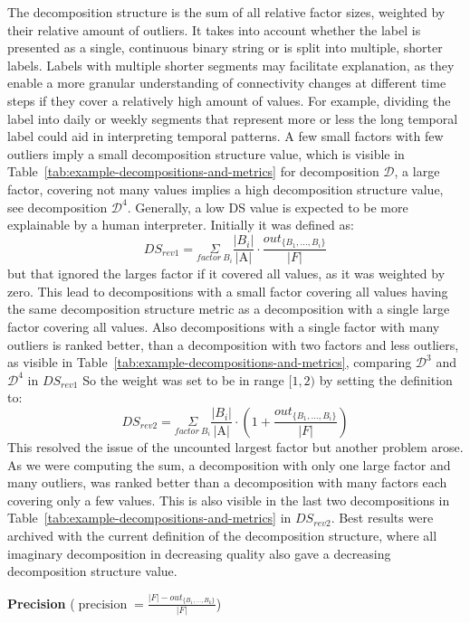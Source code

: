 The decomposition structure is the sum of all relative factor sizes, weighted by their relative amount of outliers.
It takes into account whether the label is presented as a single, continuous binary string or is split into multiple, shorter labels.
Labels with multiple shorter segments may facilitate explanation, as they enable a more granular understanding of connectivity changes at different time steps if they cover a relatively high amount of values.
For example, dividing the label into daily or weekly segments that represent more or less the long temporal label could aid in interpreting temporal patterns.
A few small factors with few outliers imply a small decomposition structure value, which is visible in Table~\ref{tab:example-decompositions-and-metrics} for decomposition $\mathcal{D}$, a large factor, covering not many values implies a high decomposition structure value, see decomposition $\mathcal{D}^4$.
Generally, a low DS value is expected to be more explainable by a human interpreter.
Initially it was defined as:
$$DS_{rev1} = \underset{factor~ B_i}{\Sigma}\frac{|B_i|}{\text{|A|}} \cdot \frac{out_{\{B_1,\dots,B_i\}}}{|F|}$$
but that ignored the larges factor if it covered all values, as it was weighted by zero.
This lead to decompositions with a small factor covering all values having the same decomposition structure metric as a decomposition with a single large factor covering all values.
Also decompositions with a single factor with many outliers is ranked better, than a decomposition with two factors and less outliers, as visible in Table~\ref{tab:example-decompositions-and-metrics}, comparing $\mathcal{D}^3$ and $\mathcal{D}^4$ in $DS_{rev1}$
So the weight was set to be in range $[1,2)$ by setting the definition to:
$$DS_{rev2} = \underset{factor~ B_i}{\Sigma}\frac{|B_i|}{\text{|A|}} \cdot (1 + \frac{out_{\{B_1,\dots,B_i\}}}{|F|})$$
This resolved the issue of the uncounted largest factor but another problem arose.
As we were computing the sum, a decomposition with only one large factor and many outliers, was ranked better than a decomposition with many factors each covering only a few values.
This is also visible in the last two decompositions in Table~\ref{tab:example-decompositions-and-metrics} in $DS_{rev2}$.
Best results were archived with the current definition of the decomposition structure, where all imaginary decomposition in decreasing quality also gave a decreasing decomposition structure value.

\textbf{Precision} ($\operatorname{precision} = \frac{|F| - out_{\{B_1,\dots,B_k\}}}{|F|}$)

